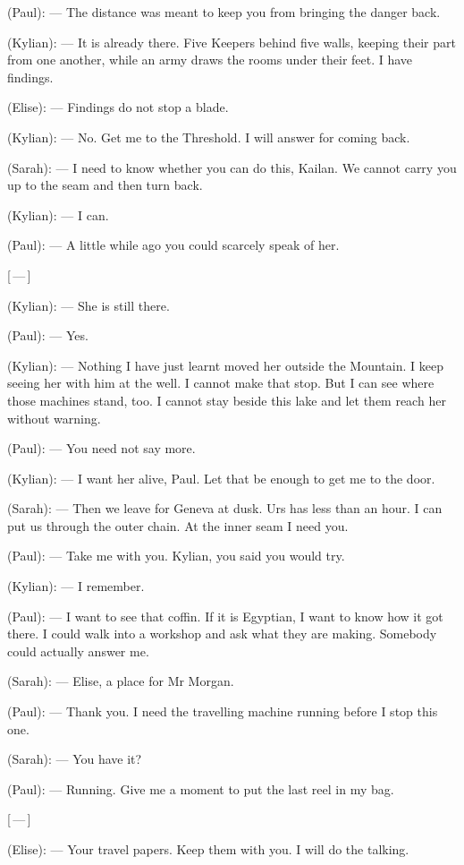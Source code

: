 \begin{room}
(Paul): --- The distance was meant to keep you from bringing the danger back.

(Kylian): --- It is already there. Five Keepers behind five walls, keeping their part from one another, while an army draws the rooms under their feet. I have findings.

(Elise): --- Findings do not stop a blade.

(Kylian): --- No. Get me to the Threshold. I will answer for coming back.

(Sarah): --- I need to know whether you can do this, Kailan. We cannot carry you up to the seam and then turn back.

(Kylian): --- I can.

(Paul): --- A little while ago you could scarcely speak of her.

\centerline{[\,---\,]}

(Kylian): --- She is still there.

(Paul): --- Yes.

(Kylian): --- Nothing I have just learnt moved her outside the Mountain. I keep seeing her with him at the well. I cannot make that stop. But I can see where those machines stand, too. I cannot stay beside this lake and let them reach her without warning.

(Paul): --- You need not say more.

(Kylian): --- I want her alive, Paul. Let that be enough to get me to the door.

(Sarah): --- Then we leave for Geneva at dusk. Urs has less than an hour. I can put us through the outer chain. At the inner seam I need you.

(Paul): --- Take me with you. Kylian, you said you would try.

(Kylian): --- I remember.

(Paul): --- I want to see that coffin. If it is Egyptian, I want to know how it got there. I could walk into a workshop and ask what they are making. Somebody could actually answer me.

(Sarah): --- Elise, a place for Mr Morgan.

(Paul): --- Thank you. I need the travelling machine running before I stop this one.

(Sarah): --- You have it?

(Paul): --- Running. Give me a moment to put the last reel in my bag.

\centerline{[\,---\,]}

(Elise): --- Your travel papers. Keep them with you. I will do the talking.


\end{room}

